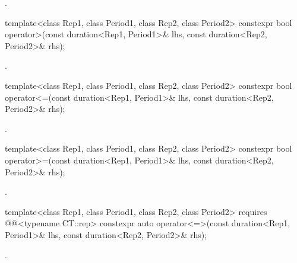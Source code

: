 \begin{itemdescr}
\pnum
\returns
{}.
\end{itemdescr}

%
\begin{itemdecl}
template<class Rep1, class Period1, class Rep2, class Period2>
  constexpr bool operator>(const duration<Rep1, Period1>& lhs,
                           const duration<Rep2, Period2>& rhs);
\end{itemdecl}

\begin{itemdescr}
\pnum
\returns
{}.
\end{itemdescr}

%
\begin{itemdecl}
template<class Rep1, class Period1, class Rep2, class Period2>
  constexpr bool operator<=(const duration<Rep1, Period1>& lhs,
                            const duration<Rep2, Period2>& rhs);
\end{itemdecl}

\begin{itemdescr}
\pnum
\returns
{}.
\end{itemdescr}

%
\begin{itemdecl}
template<class Rep1, class Period1, class Rep2, class Period2>
  constexpr bool operator>=(const duration<Rep1, Period1>& lhs,
                            const duration<Rep2, Period2>& rhs);
\end{itemdecl}

\begin{itemdescr}
\pnum
\returns
{}.
\end{itemdescr}

%
\begin{itemdecl}
template<class Rep1, class Period1, class Rep2, class Period2>
  requires @@<typename CT::rep>
  constexpr auto operator<=>(const duration<Rep1, Period1>& lhs,
                             const duration<Rep2, Period2>& rhs);
\end{itemdecl}

\begin{itemdescr}
\pnum
\returns
{}.
\end{itemdescr}

